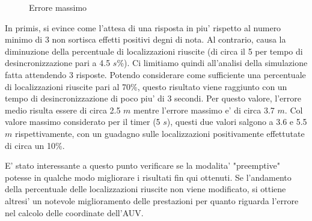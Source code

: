 \documentclass[Lau,binding=0.6cm]{sapthesis}
\begin{document}
\begin{figure}[H]
    \centering
    \hfill
    \caption{Errore massimo}
\end{figure}

In primis, si evince come l'attesa di una risposta in piu' rispetto al numero minimo di 3 non sortisca effetti positivi degni di nota. Al contrario, causa la diminuzione della percentuale di localizzazioni riuscite (di circa il 5 per tempo di desincronizzazione pari a 4.5 $s$\%).
Ci limitiamo quindi all'analisi della simulazione fatta attendendo 3 risposte.
Potendo considerare come sufficiente una percentuale di localizzazioni riuscite pari al 70\%, questo risultato viene raggiunto con un tempo di desincronizzazione di poco piu' di 3 secondi. Per questo valore, l'errore medio risulta essere di circa 2.5 $m$ mentre l'errore massimo e' di circa 3.7 $m$.
Col valore massimo considerato per il timer (5 $s$), questi due valori salgono a 3.6 e 5.5 $m$ rispettivamente, con un guadagno sulle localizzazioni positivamente effettutate di circa un 10\%.

E' stato interessante a questo punto verificare se la modalita' "preemptive" potesse in qualche modo migliorare i risultati fin qui ottenuti.
Se l'andamento della percentuale delle localizzazioni riuscite non viene modificato, si ottiene altresi' un notevole miglioramento delle prestazioni per quanto riguarda l'errore nel calcolo delle coordinate dell'AUV.
\end{document}
